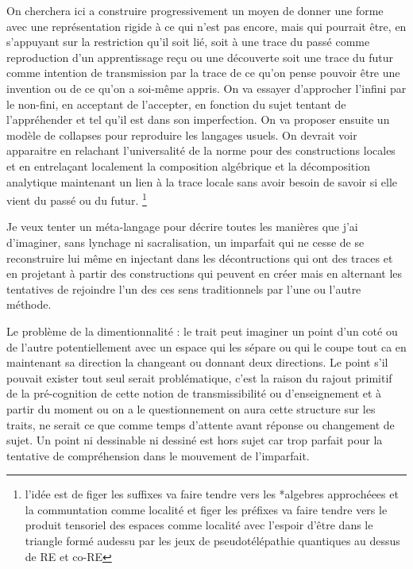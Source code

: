 \documentclass{article}
\begin{document}
On cherchera  ici a construire progressivement un moyen de donner une forme avec une représentation rigide  à ce qui n'est pas encore, mais qui pourrait être, 
en s'appuyant sur la restriction qu'il soit lié, soit à une trace du passé comme reproduction d'un apprentissage reçu ou une découverte soit une trace du futur comme intention de transmission par la trace de ce qu'on pense pouvoir être une invention ou de ce qu'on a soi-même appris. On va essayer d'approcher l'infini par le non-fini, en acceptant de  l'accepter, en fonction du sujet tentant de l'appréhender et  tel qu'il est dans son imperfection.  On va proposer ensuite un modèle de collapses  pour reproduire les langages usuels. On  devrait voir   apparaitre  en relachant l'universalité de la norme pour des constructions locales et en entrelaçant localement  la composition algébrique et la décomposition analytique  maintenant un lien  à la trace locale sans avoir besoin de savoir si elle vient du passé ou du futur.  \footnote{l'idée est de figer les suffixes va faire tendre vers les *algebres approchéees et la communtation comme localité et figer les préfixes va faire tendre vers le produit tensoriel des espaces comme localité avec l'espoir d'être dans le triangle formé audessu par les jeux de pseudotélépathie quantiques au dessus de RE et co-RE}   

Je veux  tenter un méta-langage pour décrire toutes les manières que j'ai d'imaginer, sans lynchage ni sacralisation, un imparfait qui ne cesse de se reconstruire lui même en injectant dans les décontructions qui ont des traces et en projetant à partir des constructions qui peuvent en créer mais en alternant les tentatives de rejoindre l'un des ces sens traditionnels par l'une ou l'autre méthode.

Le problème de la dimentionnalité : le trait peut imaginer un point d'un coté ou de l'autre potentiellement avec un espace qui les sépare  ou qui le coupe tout ca en maintenant sa direction la changeant ou donnant deux directions. Le point s'il pouvait exister tout seul serait problématique, c'est la raison du rajout primitif de la pré-cognition de cette notion de transmissibilité ou d'enseignement et à partir du moment ou on a le questionnement on aura cette structure sur les traits, ne serait ce que comme temps d'attente avant réponse ou changement de sujet. Un point ni dessinable ni dessiné est hors sujet car trop parfait pour la tentative de compréhension dans le mouvement de l'imparfait.
\end{document}
